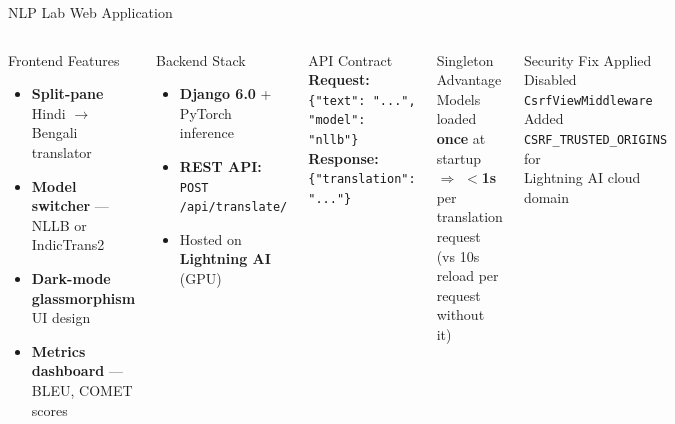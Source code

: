 \documentclass[aspectratio=169]{beamer}
\begin{document}
\begin{frame}{NLP Lab Web Application}
\begin{columns}[T]
    \begin{block}{Frontend Features}
      \begin{itemize}
        \item \textbf{Split-pane} Hindi $\rightarrow$ Bengali translator
        \item \textbf{Model switcher} — NLLB or IndicTrans2
        \item \textbf{Dark-mode glassmorphism} UI design
        \item \textbf{Metrics dashboard} — BLEU, COMET scores
      \end{itemize}
    \end{block}
    \vspace{0.3em}
    \begin{block}{Backend Stack}
      \begin{itemize}
        \item \textbf{Django 6.0} + PyTorch inference
        \item \textbf{REST API:} \texttt{POST /api/translate/}
        \item Hosted on \textbf{Lightning AI} (GPU)
      \end{itemize}
    \end{block}
    \begin{alertblock}{API Contract}
      \textbf{Request:} \texttt{\{"text": "...", "model": "nllb"\}}\\
      \vspace{0.2em}
      \textbf{Response:} \texttt{\{"translation": "..."\}}
    \end{alertblock}
    \vspace{0.3em}
    \begin{block}{Singleton Advantage}
      Models loaded \textbf{once} at startup\\
      $\Rightarrow$ \textbf{$<$1s} per translation request\\
      (vs 10s reload per request without it)
    \end{block}
    \vspace{0.3em}
    \begin{block}{Security Fix Applied}
      Disabled \texttt{CsrfViewMiddleware}\\
      Added \texttt{CSRF\_TRUSTED\_ORIGINS} for\\Lightning AI cloud domain
    \end{block}
\end{columns}
\end{frame}
\end{document}
